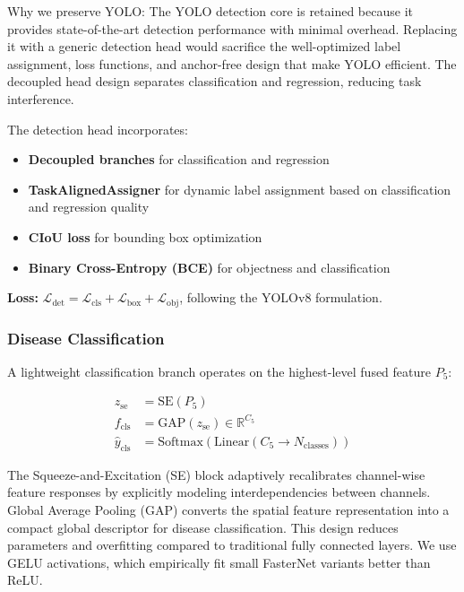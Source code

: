 \documentclass[10pt,a4paper,twocolumn]{article}
\begin{document}
Why we preserve YOLO: The YOLO detection core is retained because it provides state-of-the-art detection performance with minimal overhead. Replacing it with a generic detection head would sacrifice the well-optimized label assignment, loss functions, and anchor-free design that make YOLO efficient. The decoupled head design separates classification and regression, reducing task interference.

The detection head incorporates:
\begin{itemize}
    \item \textbf{Decoupled branches} for classification and regression
    \item \textbf{TaskAlignedAssigner} for dynamic label assignment based on classification and regression quality
    \item \textbf{CIoU loss} for bounding box optimization
    \item \textbf{Binary Cross-Entropy (BCE)} for objectness and classification
\end{itemize}

\textbf{Loss:} $\mathcal{L}_{\text{det}} = \mathcal{L}_{\text{cls}} + \mathcal{L}_{\text{box}} + \mathcal{L}_{\text{obj}}$, following the YOLOv8 formulation.

\subsubsection{Disease Classification}

A lightweight classification branch operates on the highest-level fused feature $P_5$:

\begin{align}
z_{\text{se}} &= \text{SE}(P_5) \\
f_{\text{cls}} &= \text{GAP}(z_{\text{se}}) \in \mathbb{R}^{C_5} \\
\hat{y}_{\text{cls}} &= \text{Softmax}(\text{Linear}(C_5 \rightarrow N_{\text{classes}}))
\end{align}

The Squeeze-and-Excitation (SE) block adaptively recalibrates channel-wise feature responses by explicitly modeling interdependencies between channels. Global Average Pooling (GAP) converts the spatial feature representation into a compact global descriptor for disease classification. This design reduces parameters and overfitting compared to traditional fully connected layers. We use GELU activations, which empirically fit small FasterNet variants better than ReLU.
\end{document}
